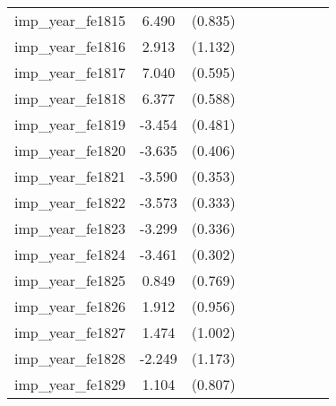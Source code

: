 {\begin{tabular}{l*{4}{cc}}
imp\_year\_fe1815&    6.490\sym{***}&  (0.835)&                  &         &                  &         &                  &         \\
imp\_year\_fe1816&    2.913\sym{*}  &  (1.132)&                  &         &                  &         &                  &         \\
imp\_year\_fe1817&    7.040\sym{***}&  (0.595)&                  &         &                  &         &                  &         \\
imp\_year\_fe1818&    6.377\sym{***}&  (0.588)&                  &         &                  &         &                  &         \\
imp\_year\_fe1819&   -3.454\sym{***}&  (0.481)&                  &         &                  &         &                  &         \\
imp\_year\_fe1820&   -3.635\sym{***}&  (0.406)&                  &         &                  &         &                  &         \\
imp\_year\_fe1821&   -3.590\sym{***}&  (0.353)&                  &         &                  &         &                  &         \\
imp\_year\_fe1822&   -3.573\sym{***}&  (0.333)&                  &         &                  &         &                  &         \\
imp\_year\_fe1823&   -3.299\sym{***}&  (0.336)&                  &         &                  &         &                  &         \\
imp\_year\_fe1824&   -3.461\sym{***}&  (0.302)&                  &         &                  &         &                  &         \\
imp\_year\_fe1825&    0.849         &  (0.769)&                  &         &                  &         &                  &         \\
imp\_year\_fe1826&    1.912\sym{*}  &  (0.956)&                  &         &                  &         &                  &         \\
imp\_year\_fe1827&    1.474         &  (1.002)&                  &         &                  &         &                  &         \\
imp\_year\_fe1828&   -2.249         &  (1.173)&                  &         &                  &         &                  &         \\
imp\_year\_fe1829&    1.104         &  (0.807)&                  &         &                  &         &                  &         \\

\end{tabular}}
